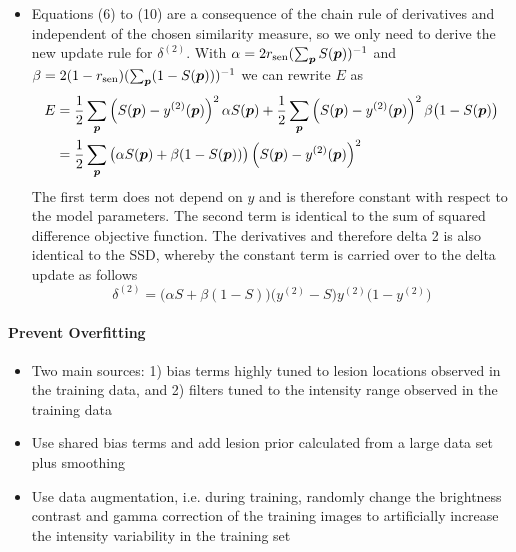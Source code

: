 \begin{itemize}
\item Equations (6) to (10) are a consequence of the chain rule of derivatives
and independent of the chosen similarity measure, so we only need to derive the
new update rule for $\delta^{(2)}$. With $\alpha = 2r_\text{sen}
(\sum_{\vect{p}}S(\vect{p}))^{-1}$ and $\beta = 2(1 -
r_\text{sen})(\sum_{\vect{p}}(1 - S(\vect{p})))^{-1}$ we can rewrite $E$ as
\begin{align} 
E &= \frac{1}{2}\sum_{\vect{p}} \left(S(\vect{p}) - y^{(2)}(\vect{p})\right)^2
\alpha S(\vect{p}) +
\frac{1}{2}\sum_{\vect{p}} \left(S(\vect{p}) - y^{(2)}(\vect{p})\right)^2
\beta\big(1 - S(\vect{p})\big) \\
 &= \frac{1}{2}\sum_{\vect{p}} \big(\alpha S(\vect{p}) +
 \beta(1 - S(\vect{p}))\big)
 \left(S(\vect{p}) - y^{(2)}(\vect{p})\right)^2
\end{align}
The first term does not depend on $y$ and is therefore constant with respect to
the model parameters. The second term is identical to the sum of squared
difference objective function. The derivatives and therefore delta 2 is
also identical to the SSD, whereby the constant term is carried over to the
delta update as follows
\begin{equation} 
\delta^{(2)} = \big(\alpha S + \beta (1 - S)\big)\big(y^{(2)} - S\big) y^{(2)}
\big(1 - y^{(2)}\big)
\end{equation}

\end{itemize}

\paragraph{Prevent Overfitting}
\begin{itemize}
\item Two main sources: 1) bias terms highly tuned to lesion locations observed
in the training data, and 2) filters tuned to the intensity range observed in
the training data
\item Use shared bias terms and add lesion prior calculated from a large data
set plus smoothing
\item Use data augmentation, i.e. during training, randomly change the
brightness contrast and gamma correction of the training images to artificially
increase the intensity variability in the training set
\end{itemize}

